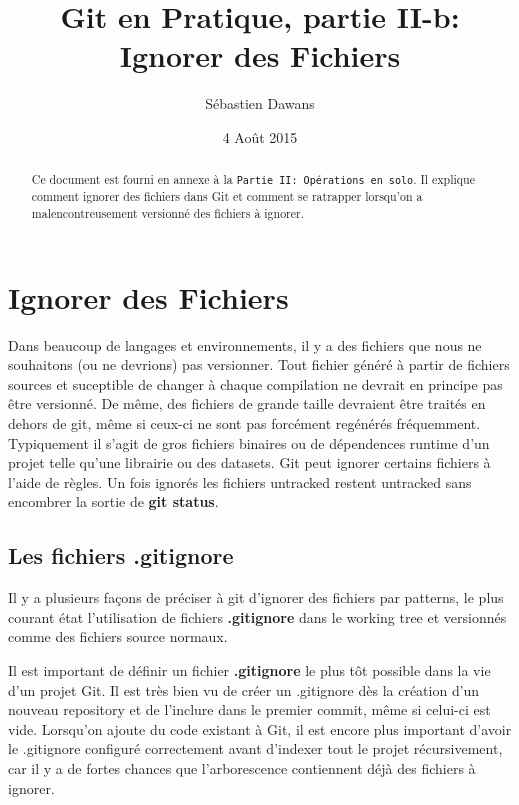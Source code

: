 \documentclass{../../common/tufte-latex/tufte-handout}
\title{Git en Pratique, partie II-b: Ignorer des Fichiers}
\author{S\'ebastien Dawans}
\date{4 Ao\^ut 2015} %
\begin{document}
\maketitle%

\begin{abstract}
\noindent
Ce document est fourni en annexe à la \texttt{Partie II: Op\'erations en solo}. Il explique comment ignorer des fichiers dans Git et comment se ratrapper lorsqu'on a malencontreusement versionné des fichiers à ignorer.
\end{abstract}

\section{Ignorer des Fichiers}
\label{section:ignore}
Dans beaucoup de langages et environnements, il y a des fichiers que nous ne souhaitons (ou ne devrions) pas versionner.
Tout fichier généré à partir de fichiers sources et suceptible de changer à chaque compilation ne devrait en principe pas être versionné.
De même, des fichiers de grande taille devraient être traités en dehors de git, même si ceux-ci ne sont pas forcément regénérés fréquemment.
Typiquement il s'agit de gros fichiers binaires ou de dépendences runtime d'un projet telle qu'une librairie ou des datasets.
Git peut ignorer certains fichiers à l'aide de règles.
Un fois ignorés les fichiers untracked restent untracked sans encombrer la sortie de \textbf{git status}.

\subsection{Les fichiers .gitignore}
Il y a plusieurs façons de préciser à git d'ignorer des fichiers par patterns, le plus courant état l'utilisation de fichiers \textbf{.gitignore} dans le working tree et versionnés comme des fichiers source normaux.

Il est important de définir un fichier \textbf{.gitignore} le plus tôt possible dans la vie d'un projet Git.
Il est très bien vu de créer un .gitignore dès la création d'un nouveau repository et de l'inclure dans le premier commit, même si celui-ci est vide.
Lorsqu'on ajoute du code existant à Git, il est encore plus important d'avoir le .gitignore configuré correctement avant d'indexer tout le projet récursivement, car il y a de fortes chances que l'arborescence contiennent déjà des fichiers à ignorer.
\end{document}
